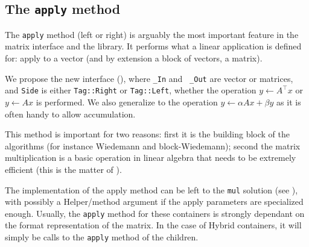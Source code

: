 \subsection{The \texttt{apply} method}\label{ssec:apply}
%
%
\par
%
The \texttt{apply} method (left or right) is arguably the most important
feature in the matrix interface and the \linbox library. It performs what a
linear application is defined for: apply to a vector (and by extension  a block
of vectors, \ie a matrix).
%
\par
%
We propose the new interface (), where {\tt \_In} and {\tt
\_Out} are vector or matrices, and {\tt Side} is either {\tt Tag::Right} or
{\tt Tag::Left}, whether the operation $y \gets A^{\top} x$ or  $y \gets A x$ is
performed. We also generalize to the operation $y \gets \alpha A x + \beta y$ as
it is often handy to allow accumulation.
%

%
This method is important for two reasons: first it is the building block of the
\applin algorithms (for instance Wiedemann and block-Wiedemann); second the
matrix multiplication is a basic operation in linear algebra that needs to be
extremely efficient (this is the matter of ).
%
%
\par
%
The implementation of the apply method can be left to the {\tt mul} solution
(see ), with possibly a Helper/method argument if the apply
parameters are specialized enough.
%
%
Usually,  the {\tt apply} method for these
containers is strongly dependant on the format representation of the matrix. In
the case of Hybrid containers, it will simply be calls to the {\tt apply}
method of the children.
%
